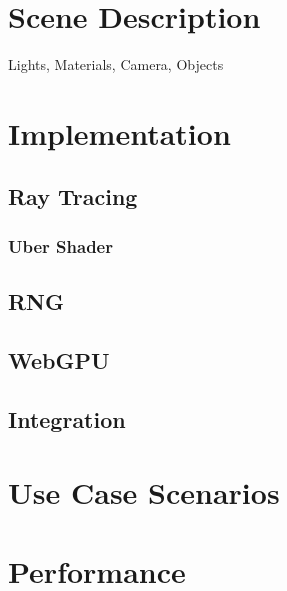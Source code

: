
\section{Scene Description}
Lights, Materials, Camera, Objects
\section{Implementation}
\subsection{Ray Tracing}
\subsubsection{Uber Shader}
\subsection{RNG}
\subsection{WebGPU}
\subsection{Integration}
\section{Use Case Scenarios}
\section{Performance}